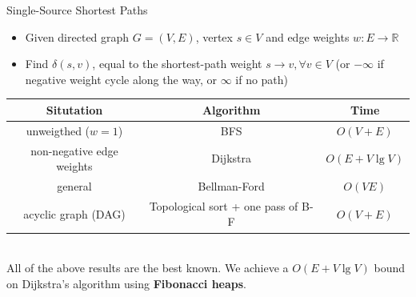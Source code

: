 \documentclass{beamer}
\begin{document}
\begin{frame}{Single-Source Shortest Paths}
    \begin{itemize}
        \item Given directed graph $G = (V, E)$, vertex $s \in V$ and edge weights $w : E \rightarrow \mathbb{R}$
        \item Find $\delta(s, v)$, equal to the shortest-path weight $s \rightarrow v, \forall v \in V$ (or $-\infty$ if negative weight cycle along the way, or $\infty$ if no path)
    \end{itemize} \pause
    \bigskip
    \scriptsize
    \centering
    \begin{tabular}{ c | c | c}
        \textbf{Situtation}         & \textbf{Algorithm}                    & \textbf{Time} \\ \hline
        unweigthed ($w = 1$)        & BFS                                   & $O(V + E)$    \\
        non-negative edge weights   & Dijkstra                              & $O(E + V \lg V)$\\
        general                     & Bellman-Ford                          & $O(VE)$       \\
        acyclic graph (DAG)         & Topological sort + one pass of B-F    & $O(V + E)$    \\
    \end{tabular}\\
    \bigskip
    All of the above results are the best known. We achieve a $O(E + V \lg V )$ bound on Dijkstra’s algorithm using \textbf{Fibonacci heaps}.
\end{frame}
\end{document}
